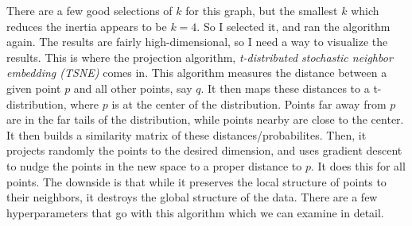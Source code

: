 \documentclass[20pt]{article} %
\begin{document}
There are a few good selections of $k$ for this graph, but the smallest $k$ which reduces the inertia appears to be $k=4$.  So I selected it, and ran the algorithm again.  The results are fairly high-dimensional, so I need a way to visualize the results.  This is where the projection algorithm, \textit{t-distributed stochastic neighbor embedding (TSNE)} comes in. This algorithm measures the distance between a given point $p$ and all other points, say $q$. It then maps these distances to a t-distribution, where $p$ is at the center of the distribution.  Points far away from $p$ are in the far tails of the distribution, while points nearby are close to the center.  It then builds a similarity matrix of these distances/probabilites.  Then, it projects randomly the points to the desired dimension, and uses gradient descent to nudge the points in the new space to a proper distance to $p$. It does this for all points.  The downside is that while it preserves the local structure of points to their neighbors, it destroys the global structure of the data.  There are a few hyperparameters that go with this algorithm which we can examine in detail.
\end{document}
